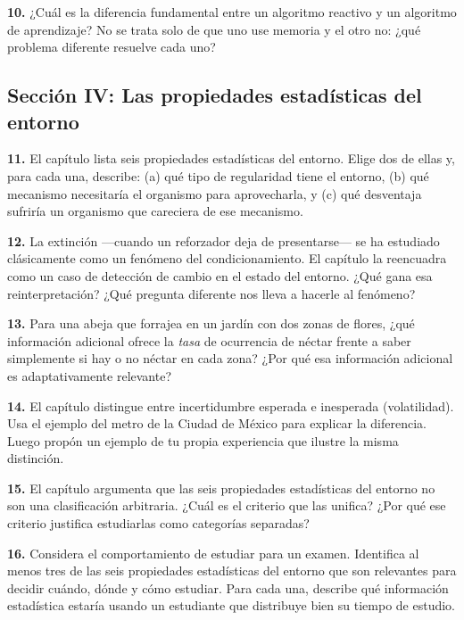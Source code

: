 \documentclass[
  letterpaper,
  DIV=11,
  numbers=noendperiod]{scrreprt}
\begin{document}
\textbf{10.} ¿Cuál es la diferencia fundamental entre un algoritmo
reactivo y un algoritmo de aprendizaje? No se trata solo de que uno use
memoria y el otro no: ¿qué problema diferente resuelve cada uno?

\subsection{Sección IV: Las propiedades estadísticas del
entorno}\label{secciuxf3n-iv-las-propiedades-estaduxedsticas-del-entorno}

\textbf{11.} El capítulo lista seis propiedades estadísticas del
entorno. Elige dos de ellas y, para cada una, describe: (a) qué tipo de
regularidad tiene el entorno, (b) qué mecanismo necesitaría el organismo
para aprovecharla, y (c) qué desventaja sufriría un organismo que
careciera de ese mecanismo.

\textbf{12.} La extinción ---cuando un reforzador deja de presentarse---
se ha estudiado clásicamente como un fenómeno del condicionamiento. El
capítulo la reencuadra como un caso de detección de cambio en el estado
del entorno. ¿Qué gana esa reinterpretación? ¿Qué pregunta diferente nos
lleva a hacerle al fenómeno?

\textbf{13.} Para una abeja que forrajea en un jardín con dos zonas de
flores, ¿qué información adicional ofrece la \emph{tasa} de ocurrencia
de néctar frente a saber simplemente si hay o no néctar en cada zona?
¿Por qué esa información adicional es adaptativamente relevante?

\textbf{14.} El capítulo distingue entre incertidumbre esperada e
inesperada (volatilidad). Usa el ejemplo del metro de la Ciudad de
México para explicar la diferencia. Luego propón un ejemplo de tu propia
experiencia que ilustre la misma distinción.

\textbf{15.} El capítulo argumenta que las seis propiedades estadísticas
del entorno no son una clasificación arbitraria. ¿Cuál es el criterio
que las unifica? ¿Por qué ese criterio justifica estudiarlas como
categorías separadas?

\textbf{16.} Considera el comportamiento de estudiar para un examen.
Identifica al menos tres de las seis propiedades estadísticas del
entorno que son relevantes para decidir cuándo, dónde y cómo estudiar.
Para cada una, describe qué información estadística estaría usando un
estudiante que distribuye bien su tiempo de estudio.

\end{document}
